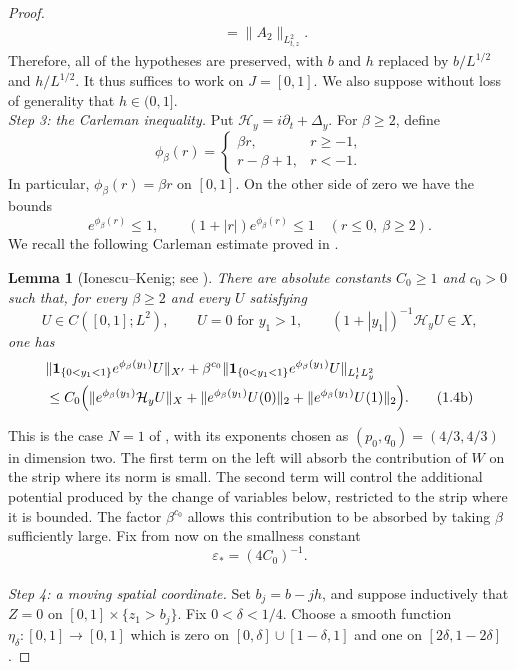 \documentclass[11pt]{amsart}
\newtheorem{lemma}[theorem]{Lemma}
\theoremstyle{remark}
\newcommand{\HH}{\mathcal H}
\newcommand{\1}{\mathbf 1}
\begin{document}
\begin{proof}
\begin{align*}
 &=\|A_2\|_{L^2_{t,z}}.
\end{align*}
Therefore, all of the hypotheses are preserved, with $b$ and $h$ replaced by $b/L^{1/2}$ and $h/L^{1/2}$. It thus suffices to work on $J=[0,1]$. We also suppose without loss of generality that $h \in (0,1].$
\\
\noindent\emph{Step 3: the Carleman inequality.}
Put $\HH_y=i\partial_t+\Delta_y$.  For $\beta\ge2$, define
\[
 \phi_\beta(r)=
 \begin{cases}
  \beta r,&r\ge-1,\\
  r-\beta+1,&r<-1.
 \end{cases}
\]
In particular, $\phi_\beta(r)=\beta r$ on $[0,1]$.  On the other side of
zero we have the bounds
\[
 e^{\phi_\beta(r)}\le1,
 \qquad
 (1+|r|)e^{\phi_\beta(r)}\le1
 \quad(r\le0,\ \beta\ge2).
 \label{eq:IK-weight-left}\tag{1.4a}
\]
We recall the following Carleman estimate proved in \cite{IonescuKenig}.
\begin{lemma}[Ionescu--Kenig; see \cite{IonescuKenig}]
There are absolute constants $C_0\ge1$ and $c_0>0$ such that, for every
$\beta\ge2$ and every $U$ satisfying
\[
 U\in C([0,1];L^2),\qquad
 U=0\text{ for }y_1>1,\qquad
 (1+|y_1|)^{-1}\HH_yU\in X,
\]
one has
\begin{align*}
 &\|\1_{\{0<y_1<1\}}e^{\phi_\beta(y_1)}U\|_{X'}
 +\beta^{c_0}
  \|\1_{\{0<y_1<1\}}e^{\phi_\beta(y_1)}U\|_{L^1_tL^2_y}\\
 &\le C_0\Bigl(
 \|e^{\phi_\beta(y_1)}\HH_yU\|_X
 +\|e^{\phi_\beta(y_1)}U(0)\|_2
 +\|e^{\phi_\beta(y_1)}U(1)\|_2\Bigr).
 \tag{1.4b}\label{eq:IK-bounded-weight}
\end{align*}
\end{lemma}
This is the case $N=1$ of \cite[Lemma~9.1]{IonescuKenig}, with its
exponents chosen as $(p_0,q_0)=(4/3,4/3)$ in dimension two.
The first term on the left will absorb the contribution of $W$
on the strip where its norm is small. The second term will control
the additional potential produced by the change of variables below,
restricted to the strip where it is bounded. The factor
$\beta^{c_0}$ allows this contribution to be absorbed by taking
$\beta$ sufficiently large. Fix from now on the smallness constant
\[
 \varepsilon_*=(4C_0)^{-1}.
\]
\\
\noindent\emph{Step 4: a moving spatial coordinate.}
Set $b_j=b-jh$, and suppose inductively that
$Z=0$ on $[0,1]\times\{z_1>b_j\}$. Fix $0<\delta<1/4$.  Choose a smooth function
$\eta_\delta:[0,1]\to[0,1]$ which is zero on
$[0,\delta]\cup[1-\delta,1]$ and one on $[2\delta,1-2\delta]$.

\end{proof}
\end{document}
